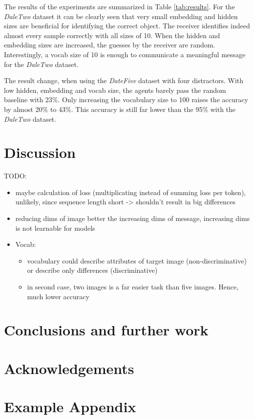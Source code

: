 \documentclass[11pt]{article}
\begin{document}
The results of the experiments are summarized in Table \ref{tab:results}. For the \emph{DaleTwo} dataset it can be clearly seen that very small embedding and hidden sizes are beneficial for identifying the correct object. The receiver identifies indeed almost every sample correctly with all sizes of 10. When the hidden and embedding sizes are increased, the guesses by the receiver are random. Interestingly, a vocab size of 10 is enough to communicate a meaningful message for the \emph{DaleTwo} dataset.

The result change, when using the \emph{DateFive} dataset with four distractors. With low hidden, embedding and vocab size, the agents barely pass the random baseline with 23\%. Only increasing the vocabulary size to 100 raises the accuracy by almost 20\% to 43\%. This accuracy is still far lower than the 95\% with the \emph{DaleTwo} dataset.

\section{Discussion}
TODO:
\begin{itemize}
  \item maybe calculation of loss (multiplicating instead of summing loss per token), unlikely, since sequence length short -> shouldn't result in big differences
  \item reducing dims of image better the increasing dims of message, increasing dims is not learnable for models
  \item Vocab:
        \begin{itemize}
          \item vocabulary could describe attributes of target image (non-discriminative) or describe only differences (discriminative)
          \item in second case, two images is a far easier task than five images. Hence, much lower accuracy
        \end{itemize}
\end{itemize}



\section{Conclusions and further work}

\section*{Acknowledgements}




\appendix

\section{Example Appendix}
\end{document}

